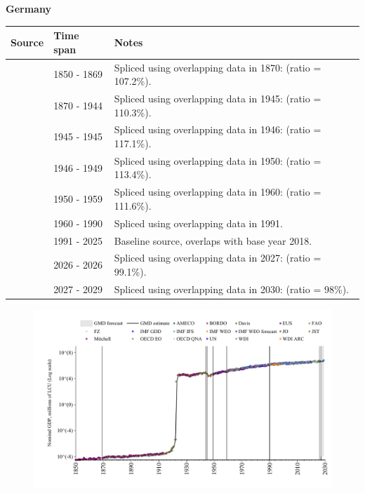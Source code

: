 \documentclass[12pt,a4paper,landscape]{article}
\begin{document}
\begin{adjustbox}{max totalsize={\paperwidth}{\paperheight},center}
\begin{minipage}[t][\textheight][t]{\textwidth}
\vspace*{0.5cm}
{}
\begin{center}
{\Large\bfseries Germany}
\end{center}
\vspace{0.5cm}
\begin{table}[H]
\centering
\small
\begin{tabular}{|l|l|l|}
\hline
\textbf{Source} & \textbf{Time span} & \textbf{Notes} \\
\hline
\rowcolor{white}\cite{Mitchell}& 1850 - 1869 &Spliced using overlapping data in 1870: (ratio = 107.2\%).\\
\rowcolor{lightgray}\cite{JST}& 1870 - 1944 &Spliced using overlapping data in 1945: (ratio = 110.3\%).\\
\rowcolor{white}\cite{BORDO}& 1945 - 1945 &Spliced using overlapping data in 1946: (ratio = 117.1\%).\\
\rowcolor{lightgray}\cite{JST}& 1946 - 1949 &Spliced using overlapping data in 1950: (ratio = 113.4\%).\\
\rowcolor{white}\cite{IMF_GDD}& 1950 - 1959 &Spliced using overlapping data in 1960: (ratio = 111.6\%).\\
\rowcolor{lightgray}\cite{WDI}& 1960 - 1990 &Spliced using overlapping data in 1991.\\
\rowcolor{white}\cite{OECD_EO}& 1991 - 2025 &Baseline source, overlaps with base year 2018.\\
\rowcolor{lightgray}\cite{AMECO}& 2026 - 2026 &Spliced using overlapping data in 2027: (ratio = 99.1\%).\\
\rowcolor{white}\cite{IMF_WEO_forecast}& 2027 - 2029 &Spliced using overlapping data in 2030: (ratio = 98\%).\\
\hline
\end{tabular}
\end{table}
\begin{figure}[H]
\centering
\includegraphics[width=\textwidth,height=0.6\textheight,keepaspectratio]{graphs/DEU_nGDP.pdf}
\end{figure}
\end{minipage}
\end{adjustbox}
\end{document}
